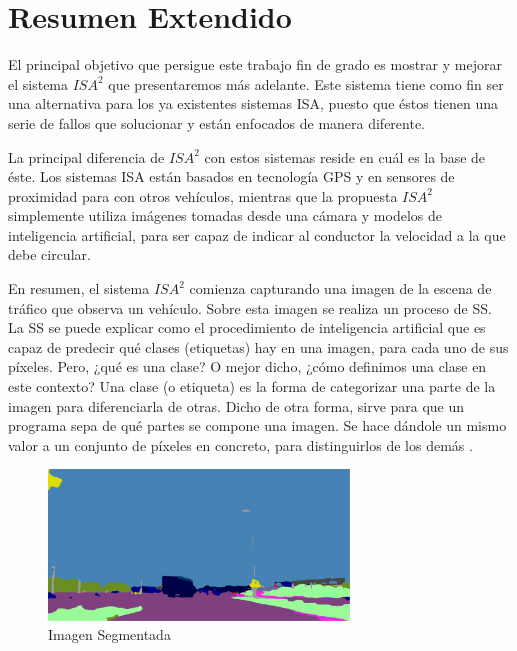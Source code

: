 \chapter{Resumen Extendido}

El principal objetivo que persigue este trabajo fin de grado es mostrar y mejorar el sistema $ISA^{2}$ que presentaremos más adelante. Este sistema tiene como fin ser una alternativa para los ya existentes sistemas \ac{ISA}, puesto que éstos tienen una serie de fallos que solucionar y están enfocados de manera diferente.

La principal diferencia de $ISA^{2}$ con estos sistemas reside en cuál es la base de éste. Los sistemas \ac{ISA} están basados en tecnología \ac{GPS} y en sensores de proximidad para con otros vehículos, mientras que la propuesta $ISA^{2}$ simplemente utiliza imágenes tomadas desde una cámara y modelos de inteligencia artificial, para ser capaz de indicar al conductor la velocidad a la que debe circular.

En resumen, el sistema $ISA^{2}$ comienza capturando una imagen de la escena de tráfico que observa un vehículo. Sobre esta imagen se realiza un proceso de \ac{SS}. La \ac{SS} se puede explicar como el procedimiento de inteligencia artificial que es capaz de predecir qué clases (etiquetas) hay en una imagen, para cada uno de sus píxeles. Pero, ¿qué es una clase? O mejor dicho, ¿cómo definimos una clase en este contexto? Una clase (o etiqueta) es la forma de categorizar una parte de la imagen para diferenciarla de otras. Dicho de otra forma, sirve para que un programa sepa de qué partes se compone una imagen. Se hace dándole un mismo valor a un conjunto de píxeles en concreto, para distinguirlos de los demás \cite{deeplab}.

\begin{figure}[H]
  \centering
  \includegraphics[width=8cm]{Figuras/Ejemplo_Imagen_Segmentada.eps}
  \caption{Imagen Segmentada}
    \label{fig:ImgSeg}
\end{figure}

